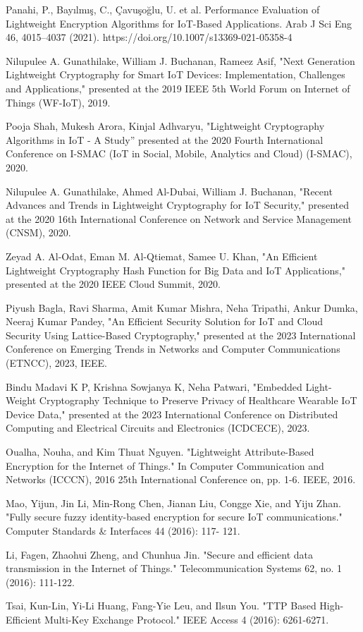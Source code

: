 \documentclass[conference, a4paper]{IEEEtran}
\begin{document}
	\begin{thebibliography}{1}

Panahi, P., Bayılmış, C., Çavuşoğlu, U. et al. Performance Evaluation of Lightweight Encryption Algorithms for IoT-Based Applications. Arab J Sci Eng 46, 4015–4037 (2021). https://doi.org/10.1007/s13369-021-05358-4
            
Nilupulee A. Gunathilake, William J. Buchanan, Rameez Asif, "Next Generation Lightweight Cryptography for Smart IoT Devices: Implementation, Challenges and Applications," presented at the 2019 IEEE 5th World Forum on Internet of Things (WF-IoT), 2019. 
  
Pooja Shah, Mukesh Arora, Kinjal Adhvaryu, "Lightweight Cryptography Algorithms in IoT - A Study” presented at the 2020 Fourth International Conference on I-SMAC (IoT in Social, Mobile, Analytics and Cloud) (I-SMAC), 2020.  
  
Nilupulee A. Gunathilake, Ahmed Al-Dubai, William J. Buchanan, "Recent Advances and Trends in Lightweight Cryptography for IoT Security," presented at the 2020 16th International Conference on Network and Service Management (CNSM), 2020.  
  
Zeyad A. Al-Odat, Eman M. Al-Qtiemat, Samee U. Khan, "An Efficient Lightweight Cryptography Hash Function for Big Data and IoT Applications," presented at the 2020 IEEE Cloud Summit, 2020.
  
Piyush Bagla, Ravi Sharma, Amit Kumar Mishra, Neha Tripathi, Ankur Dumka, Neeraj Kumar Pandey, "An Efficient Security Solution for IoT and Cloud Security Using Lattice-Based Cryptography," presented at the 2023 International Conference on Emerging Trends in Networks and Computer Communications (ETNCC), 2023, IEEE.
  
Bindu Madavi K P, Krishna Sowjanya K, Neha Patwari, "Embedded Light-Weight Cryptography Technique to Preserve Privacy of Healthcare Wearable IoT Device Data," presented at the 2023 International Conference on Distributed Computing and Electrical Circuits and Electronics (ICDCECE), 2023.
  
Oualha, Nouha, and Kim Thuat Nguyen. "Lightweight Attribute-Based Encryption for the Internet of Things." In Computer Communication and Networks (ICCCN), 2016 25th International Conference on, pp. 1-6. IEEE, 2016.
  
Mao, Yijun, Jin Li, Min-Rong Chen, Jianan Liu, Congge Xie, and Yiju Zhan. "Fully secure fuzzy identity-based encryption for secure IoT communications." Computer Standards \& Interfaces 44 (2016): 117- 121.
  
Li, Fagen, Zhaohui Zheng, and Chunhua Jin. "Secure and efficient data transmission in the Internet of Things." Telecommunication Systems 62, no. 1 (2016): 111-122.
  
Tsai, Kun-Lin, Yi-Li Huang, Fang-Yie Leu, and Ilsun You. "TTP Based High-Efficient Multi-Key Exchange Protocol." IEEE Access 4 (2016): 6261-6271. 
		
	\end{thebibliography}
\end{document}
